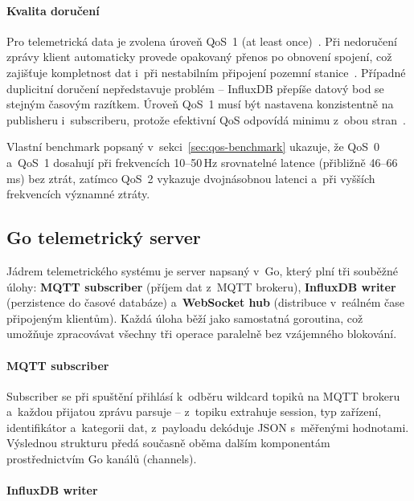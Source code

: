 \paragraph{Kvalita doručení}

Pro telemetrická data je zvolena úroveň QoS~1 (at least once)~\cite{mqtt2014oasis}. Při nedoručení zprávy klient automaticky provede opakovaný přenos po obnovení spojení, což zajišťuje kompletnost dat i~při nestabilním připojení pozemní stanice~\cite{kegenbekov2022mqtt}. Případné duplicitní doručení nepředstavuje problém -- InfluxDB přepíše datový bod se stejným časovým razítkem. Úroveň QoS~1 musí být nastavena konzistentně na publisheru i~subscriberu, protože efektivní QoS odpovídá minimu z~obou stran~\cite{mqtt2014oasis}.

Vlastní benchmark popsaný v~sekci~\ref{sec:qos-benchmark} ukazuje, že QoS~0 a~QoS~1 dosahují při frekvencích 10--50\,Hz srovnatelné latence (přibližně 46--66\,ms) bez ztrát, zatímco QoS~2 vykazuje dvojnásobnou latenci a~při vyšších frekvencích významné ztráty.

\subsection{Go telemetrický server}

Jádrem telemetrického systému je server napsaný v~Go, který plní tři souběžné úlohy: \textbf{MQTT subscriber} (příjem dat z~MQTT brokeru), \textbf{InfluxDB writer} (perzistence do časové databáze) a~\textbf{WebSocket hub} (distribuce v~reálném čase připojeným klientům). Každá úloha běží jako samostatná goroutina, což umožňuje zpracovávat všechny tři operace paralelně bez vzájemného blokování.

\paragraph{MQTT subscriber}

Subscriber se při spuštění přihlásí k~odběru wildcard topiků na MQTT brokeru a~každou přijatou zprávu parsuje -- z~topiku extrahuje session, typ zařízení, identifikátor a~kategorii dat, z~payloadu dekóduje JSON s~měřenými hodnotami. Výslednou strukturu předá současně oběma dalším komponentám prostřednictvím Go kanálů (channels).

\paragraph{InfluxDB writer}

